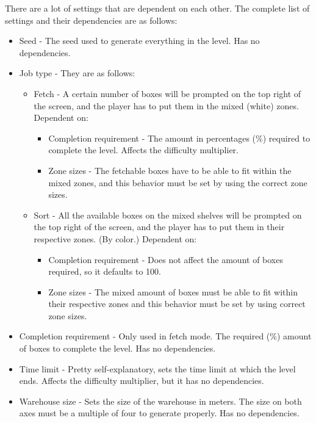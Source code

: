 \documentclass{article}
\begin{document}
\normalsize
There are a lot of settings that are dependent on each other. The complete list of settings and their dependencies are as follows:
\begin{itemize}
    \item Seed - The seed used to generate everything in the level. Has no dependencies.
    \item Job type - They are as follows: 
    \begin{itemize}
        \item Fetch - A certain number of boxes will be prompted on the top right
        of the screen, and the player has to put them in the mixed (white)
        zones. Dependent on:
        \begin{itemize}
            \item Completion requirement - The amount in percentages (\%) required to complete the level. Affects the difficulty multiplier.
            \item Zone sizes - The fetchable boxes have to be able to fit within the
            mixed zones, and this behavior must be set by using the correct
            zone sizes.
        \end{itemize}
        \item Sort - All the available boxes on the mixed shelves will be prompted
        on the top right of the screen, and the player has to put them in their
        respective zones. (By color.) Dependent on:
        \begin{itemize}
            \item Completion requirement - Does not affect the amount of boxes
            required, so it defaults to 100.
            \item Zone sizes - The mixed amount of boxes must be able to fit
            within their respective zones and this behavior must be set by
            using correct zone sizes.
        \end{itemize}
    \end{itemize}
    \item Completion requirement - Only used in fetch mode. The required (\%) amount of boxes
    to complete the level. Has no dependencies.
    \item Time limit - Pretty self-explanatory, sets the time limit at which the level ends.
    Affects the difficulty multiplier, but it has no dependencies.
    \item Warehouse size - Sets the size of the warehouse in meters. The size on both axes must
    be a multiple of four to generate properly. Has no dependencies.

\end{itemize}
\end{document}
